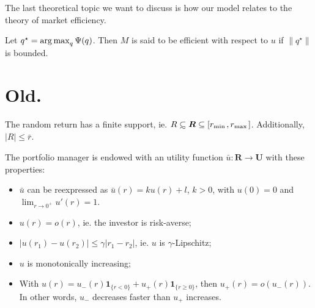 The last theoretical topic we want to discuss is how our model relates to the theory of
market efficiency. 
\begin{deff}
  Let $q^\star = \operatorname*{arg\,max}_q\Psi(q)$. Then $M$ is said to be efficient with respect to $u$
  if $\|q^\star\|$ is bounded. 
\end{deff}



























\section{Old.}



\begin{assumption}
  The random return has a finite support, ie.
  $R\subsetsim \bm R \subseteq [r_{\min{}},r_{\max{}}]$. Additionally, $|R|\leq \bar r$.
\end{assumption}

\begin{assumption}
  The portfolio manager is endowed with an utility function $\bar u:\bm R\to \bm U$ with
  these properties:
  \begin{itemize}
  \item $\bar u$ can be reexpressed as $\bar u(r) = ku(r) + l$, $k>0$, with $u(0) = 0$ and
    $\lim_{r\to0^+}u'(r) = 1$.
  \item $u(r) = o(r)$, ie. the investor is risk-averse;
  \item $|u(r_1) - u(r_2)| \leq \gamma|r_1-r_2|$, ie. $u$ is $\gamma$-Lipschitz;
  \item $u$ is monotonically increasing;
  \item With $u(r) = u_-(r)\bm1_{\{r<0\}}+u_+(r)\bm 1_{\{r\geq0\}}$, then $u_+(r) =
    o(u_-(r))$. In other words, $u_-$ decreases faster than $u_+$ increases. 
  \end{itemize}
\end{assumption}

